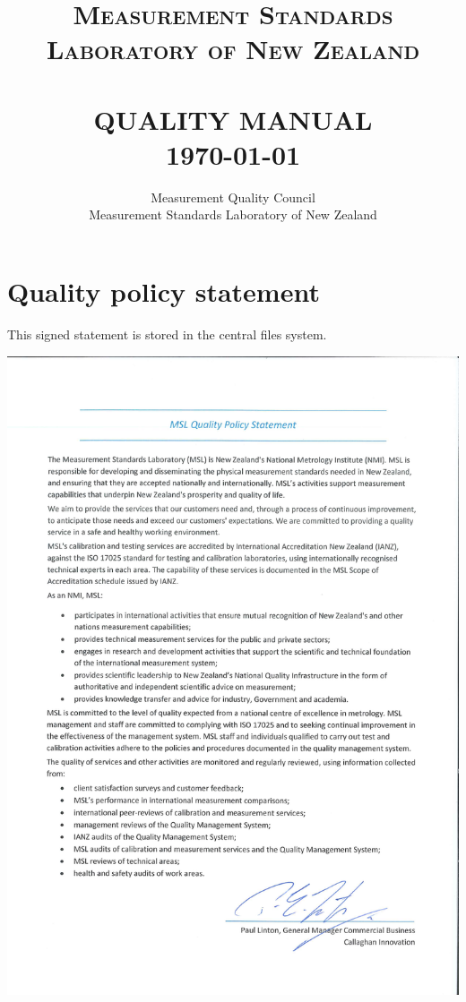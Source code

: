 \documentclass[a4paper]{article}
\title{	\Large 
	\textsc{ Measurement Standards Laboratory of New Zealand } \\ [2.0cm]			
	\HRule{2pt} \\ [0.25cm]						
	\LARGE \textbf{\uppercase{Quality Manual}}	%
	\HRule{2pt} \\ [0.25cm]		
	\Large \today			
}
\author{
Measurement Quality Council\\	
Measurement Standards Laboratory of New Zealand\\	
}
\makeatletter
\def\printtitle{%
    {\centering \@title\par}}
\def\printauthor{%
    {\raggedright \Large \@author}}
\makeatother
\begin{document}
\hypersetup{pageanchor=false}	%
\fancyhf{}	%

\thispagestyle{empty}		%
\pagestyle{plain}			%

\printtitle					%
  	\vfill
\printauthor				%
\newpage


\tableofcontents
\newpage

\section*{Quality policy statement}
\label{ss:quality_policy_statement}
This signed statement is stored in the central files system. 

\begin{center}
\includegraphics[width=1.05\textwidth]{pictures/MSL_qps_(signed)}
\end{center}
\clearpage
\end{document}
